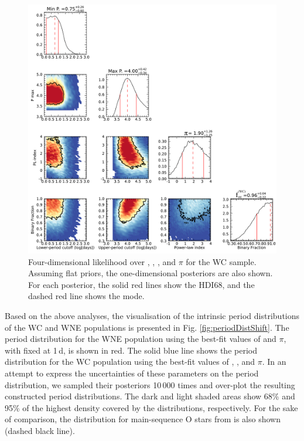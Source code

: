 \begin{figure}[t]
    \centering
    \includegraphics[width=\hsize]{chapters/WNE/image/WC_posterior.png}
    \caption{Four-dimensional likelihood over \logPmin{}, \logPmax{}, \fintWNE{} , and $\pi$ for the WC sample. Assuming flat priors, the one-dimensional posteriors are also shown. For each posterior, the solid red lines show the HDI68, and the dashed red line shows the mode.}
    \label{fig:WC_posteriors}
\end{figure}

Based on the above analyses, the visualisation of the intrinsic period distributions of the WC and WNE populations is presented in Fig. \ref{fig:periodDistShift}. The period distribution for the WNE population using the best-fit values of \logPmax{} and $\pi$, with \Pmin{} fixed at 1\,d, is shown in red. The solid blue line shows the period distribution for the WC population using the best-fit values of \logPmin{}, \logPmax{} , and $\pi$. In an attempt to express the uncertainties of these parameters on the period distribution, we sampled their posteriors 10\,000 times and over-plot the resulting constructed period distributions. The dark and light shaded areas show 68\% and 95\% of the highest density covered by the distributions, respectively. For the sake of comparison, the distribution for main-sequence O stars from \citet{2012Sana} is also shown (dashed black line). 

